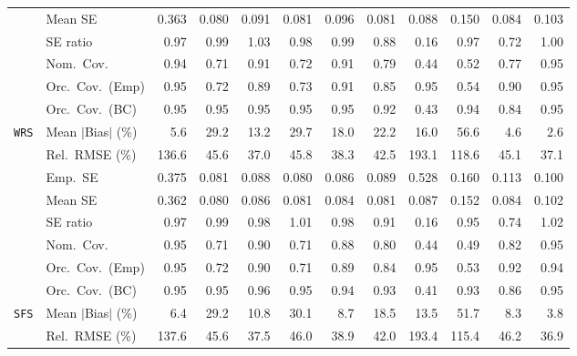 \begin{landscape}
\begin{longtable}{llrrrrrrrrrr}
 & Mean SE & 0.363 & 0.080 & 0.091 & 0.081 & 0.096 & 0.081 & 0.088 & 0.150 & 0.084 & 0.103 \\
 & SE ratio & 0.97 & \cellcolor{rankthree}0.99 & 1.03 & 0.98 & \cellcolor{ranktwo}0.99 & 0.88 & 0.16 & 0.97 & 0.72 & \cellcolor{rankone}1.00 \\
 & Nom.\ Cov. & \cellcolor{ranktwo}0.94 & 0.71 & 0.91 & 0.72 & \cellcolor{rankthree}0.91 & 0.79 & 0.44 & 0.52 & 0.77 & \cellcolor{rankone}0.95 \\
 & Orc.\ Cov.\ (Emp) & \cellcolor{rankthree}0.95 & 0.72 & 0.89 & 0.73 & 0.91 & 0.85 & \cellcolor{rankone}0.95 & 0.54 & 0.90 & \cellcolor{ranktwo}0.95 \\
 & Orc.\ Cov.\ (BC) & 0.95 & \cellcolor{ranktwo}0.95 & 0.95 & \cellcolor{rankthree}0.95 & 0.95 & 0.92 & 0.43 & 0.94 & 0.84 & \cellcolor{rankone}0.95 \\
\addlinespace[2pt]
\quad \texttt{WRS} & Mean $|$Bias$|$ (\%) & \cellcolor{rankthree}5.6 & 29.2 & 13.2 & 29.7 & 18.0 & 22.2 & 16.0 & 56.6 & \cellcolor{ranktwo}4.6 & \cellcolor{rankone}2.6 \\
 & Rel.\ RMSE (\%) & 136.6 & 45.6 & \cellcolor{rankone}37.0 & 45.8 & \cellcolor{rankthree}38.3 & 42.5 & 193.1 & 118.6 & 45.1 & \cellcolor{ranktwo}37.1 \\
 & Emp.\ SE & 0.375 & 0.081 & 0.088 & 0.080 & 0.086 & 0.089 & 0.528 & 0.160 & 0.113 & 0.100 \\
 & Mean SE & 0.362 & 0.080 & 0.086 & 0.081 & 0.084 & 0.081 & 0.087 & 0.152 & 0.084 & 0.102 \\
 & SE ratio & 0.97 & \cellcolor{rankone}0.99 & 0.98 & \cellcolor{ranktwo}1.01 & 0.98 & 0.91 & 0.16 & 0.95 & 0.74 & \cellcolor{rankthree}1.02 \\
 & Nom.\ Cov. & \cellcolor{ranktwo}0.95 & 0.71 & \cellcolor{rankthree}0.90 & 0.71 & 0.88 & 0.80 & 0.44 & 0.49 & 0.82 & \cellcolor{rankone}0.95 \\
 & Orc.\ Cov.\ (Emp) & \cellcolor{ranktwo}0.95 & 0.72 & 0.90 & 0.71 & 0.89 & 0.84 & \cellcolor{rankone}0.95 & 0.53 & 0.92 & \cellcolor{rankthree}0.94 \\
 & Orc.\ Cov.\ (BC) & 0.95 & \cellcolor{ranktwo}0.95 & 0.96 & \cellcolor{rankthree}0.95 & 0.94 & 0.93 & 0.41 & 0.93 & 0.86 & \cellcolor{rankone}0.95 \\
\addlinespace[2pt]
\quad \texttt{SFS} & Mean $|$Bias$|$ (\%) & \cellcolor{ranktwo}6.4 & 29.2 & 10.8 & 30.1 & 8.7 & 18.5 & 13.5 & 51.7 & \cellcolor{rankthree}8.3 & \cellcolor{rankone}3.8 \\
 & Rel.\ RMSE (\%) & 137.6 & 45.6 & \cellcolor{ranktwo}37.5 & 46.0 & \cellcolor{rankthree}38.9 & 42.0 & 193.4 & 115.4 & 46.2 & \cellcolor{rankone}36.9 \\

\end{longtable}
\end{landscape}
